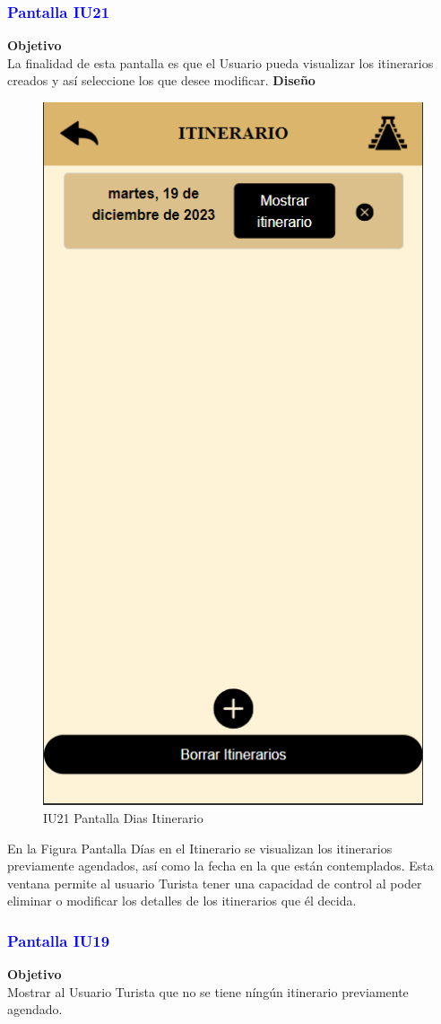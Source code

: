 \subsubsection{\textcolor{blue}{Pantalla IU21}}
\textbf{Objetivo} \\
La finalidad de esta pantalla es que el Usuario pueda visualizar los itinerarios creados y así seleccione los que desee modificar.
\vspace{15pt}
\textbf{Diseño}
\begin{figure}[h]
    \centering 
        \includegraphics[width=.5\linewidth]{entregable final/pantallasSistema/IU21 Pantalla Dias Itinerario.png}
    \caption{IU21 Pantalla Dias Itinerario}
\end{figure}
  
En la Figura Pantalla Días en el Itinerario se visualizan los itinerarios previamente agendados, así como la fecha en la que están contemplados. Esta ventana permite al usuario Turista tener una capacidad de control al poder eliminar o modificar los detalles de los itinerarios que él decida.
\newpage

\subsubsection{\textcolor{blue}{Pantalla IU19}}

\textbf{Objetivo} \\
Mostrar al Usuario Turista que no se tiene níngún itinerario previamente agendado.
\vspace{15pt}

